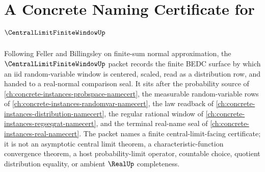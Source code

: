 \chapter{A Concrete Naming Certificate for $\CentralLimitFiniteWindowUp$}
\label{ch:concrete-instances-central-limit-finite-window-namecert}

Following Feller and Billingsley on finite-sum normal approximation, the $\CentralLimitFiniteWindowUp$ packet records the finite BEDC surface by which an iid random-variable window is centered, scaled, read as a distribution row, and handed to a real-normal comparison seal. It sits after the probability source of \autoref{ch:concrete-instances-probspace-namecert}, the measurable random-variable rows of \autoref{ch:concrete-instances-randomvar-namecert}, the law readback of \autoref{ch:concrete-instances-distribution-namecert}, the regular rational window of \autoref{ch:concrete-instances-regseqrat-namecert}, and the terminal real-name seal of \autoref{ch:concrete-instances-real-namecert}. The packet names a finite central-limit-facing certificate; it is not an asymptotic central limit theorem, a characteristic-function convergence theorem, a host probability-limit operator, countable choice, quotient distribution equality, or ambient $\RealUp$ completeness.

